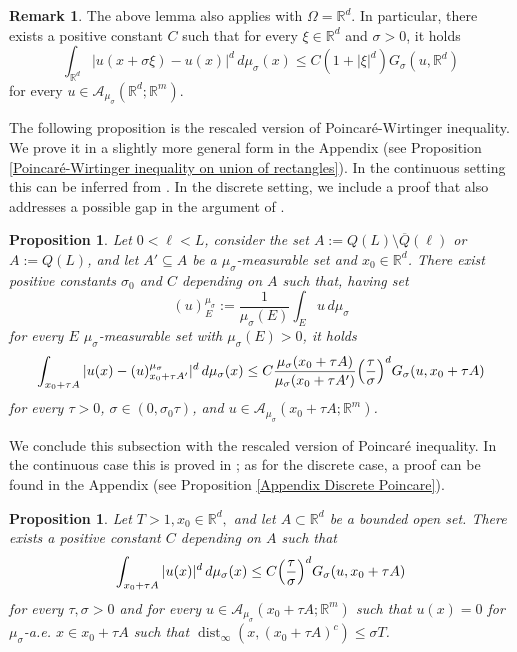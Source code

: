 \documentclass{article}
\theoremstyle{plain}
\newtheorem{proposition}[theorem]{Proposition}
\theoremstyle{definition}
\newtheorem{remark}[theorem]{Remark}
\def\rr{{\mathbb R}}
\def\ms{\mu_\sigma}
\DeclareMathOperator*{\dist}{dist}
\newcommand{\s}{\sigma}
\newcommand{\A}{\mathcal{A}}
\numberwithin{equation}{section}
\begin{document}
\begin{remark}
    The above lemma also applies with $\Omega=\rr^d$. In particular, there exists a positive constant $C$ such that for every $\xi\in \rr^d$ and $\s>0$, it holds
\begin{equation}\label{long-range Rd}
    \int_{\rr^d}|u(x+\s\xi)-u(x)|^d\,d\ms(x)\leq C(1+|\xi|^d)G_\s(u,\rr^d)
\end{equation}
for every $u \in \A_{\ms}(\rr^d ;\mathbb{R}^{m})$.
\end{remark}

The following proposition is the rescaled version of Poincar\'e-Wirtinger inequality. We prove it in a slightly more general form in the Appendix (see Proposition \ref{Poincaré-Wirtinger inequality on union of rectangles}). In the continuous setting this can be inferred from \cite[Proposition 4.2]{AABPT}. In the discrete setting, we include a proof that also addresses a possible gap in the argument of \cite[Lemma 2]{BraSig}.

\begin{proposition} \label{prop: poincare-wirtinger} Let $0<\ell<L$, consider the set $A:=Q(L)\setminus \overline{Q}(\ell)$ or $A:=Q(L)$, and let $A'\subseteq A$ be a $\ms$-measurable set and $x_0\in \rr^d$. There exist positive constants $\s_{0}$ and $C$ depending on $A$ such that, having set 
\begin{equation*}
    (u)^{\ms}_E:=\frac{1}{\ms(E)}\int_{E} u\,d\ms
    \end{equation*}
    for every $E$ $\ms$-measurable set with $\ms(E)>0$, it holds 
\begin{equation*}
    \int_{x_0+\tau A} |u(x)-(u)^{\ms}_{x_0+\tau A'}|^d\,d\ms(x)\leq C\frac{\ms(x_0+\tau A)}{\ms(x_0+\tau A')}\Bigl(\frac{\tau}{\s}\Bigr)^d G_\s(u,x_0+\tau A)
\end{equation*}
    for every $\tau>0$, $\s\in(0,\s_0\tau)$, and $u \in \mathcal{A}_{\mu_\sigma}(x_0+\tau A;\mathbb{R}^m)$.  
\end{proposition}

We conclude this subsection with the rescaled version of Poincaré inequality. In the continuous case this is proved in \cite[Proposition 4.1]{AABPT}; as for the discrete case, a proof can be found in the Appendix (see Proposition \ref{Appendix Discrete Poincare}).
\begin{proposition}
\label{prop: pcre}
    Let $T>1, x_0\in \rr^d,$ and let $A\subset \mathbb{R}^d$ be a bounded open set. There exists a positive constant $C$ depending on $A$ such that 
    \begin{equation*}
        \int_{x_0+\tau A}|u(x)|^d\, d\mu_\s(x)\leq C\Bigl(\frac{\tau}{\s}\Bigr)^d G_\s(u,x_0+\tau A)
    \end{equation*}
    for every $\tau,\s>0$ and for every $u \in \mathcal{A}_{\mu_\s}(x_0+\tau A;\mathbb{R}^m)$ such that $u(x)=0$ for $\mu_\sigma$-a.e. $x\in x_0+\tau A$ such that $\dist_\infty(x,(x_0+\tau A)^c)\leq \s T$.
\end{proposition}
\end{document}
